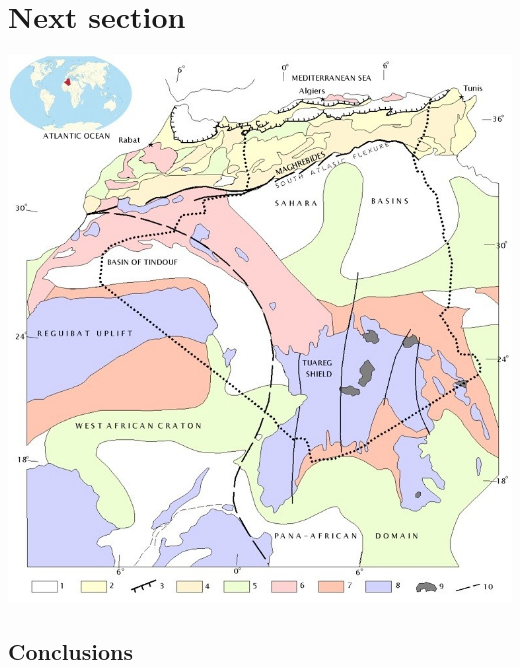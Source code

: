\documentclass[a0, portrait]{a0paper}
\begin{document}
\begin{multicols}{3}
\section{Next section}
\blindtext

\begin{center}\vspace{1cm}
    \includegraphics[width=0.8\linewidth]{Figure_1}
\end{center}\vspace{1cm}


\vspace{2cm}
\begin{tcolorbox}[width=0.95\linewidth,colback={conclusion},frame empty,boxsep=1cm]
\section{Conclusions}
\blindtext
\end{tcolorbox}    


\end{multicols}
\end{document}
